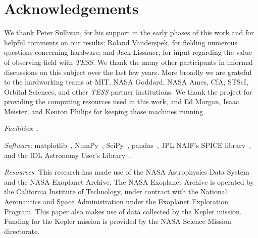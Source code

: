 \section*{Acknowledgements}
We thank Peter Sullivan, for his support in the early phases of this 
work and for helpful comments on our results;
Roland Vanderspek, for fielding numerous questions
concerning \tess hardware; and Jack Lissauer, for input regarding the value of observing 
\keplers field with \textit{TESS}.
We thank the many other participants in informal discussions on this subject over the last few years.
More broadly we are grateful to the hardworking teams 
at MIT, NASA Goddard, NASA Ames, CfA, STScI, Orbital Sciences, and other \textit{TESS} partner institutions.
We thank the \tess project for providing the computing resources used in this work, and Ed 
Morgan, Isaac Meister, and Kenton Philips for keeping those machines running.

\vspace{0.5cm}
\textit{Facilities}: \tess\!, \kepler

\textit{Software}: matplotlib~\citep{hunter_matplotlib_2007}, NumPy~\citep{walt_numpy_2011}, SciPy~\citep{jones_scipy_2001}, pandas~\citep{mckinneypandas}, JPL NAIF's SPICE library~\citep{acton_SPICE_1996}, and the IDL Astronomy User's Library~\citep{landsman_idl_1995}.

\textit{Resources}: This research has made use of the NASA Astrophysics Data System and the NASA Exoplanet Archive. The NASA Exoplanet Archive is operated by the California Institute of Technology, under contract with the National Aeronautics and Space Administration under the Exoplanet Exploration Program.
This paper also makes use of data collected by the Kepler mission. Funding for the Kepler mission is provided by the NASA Science Mission directorate.
